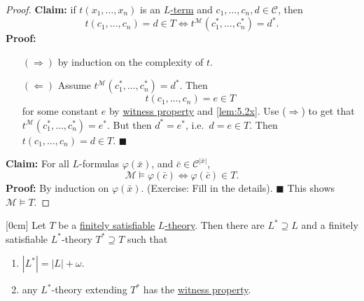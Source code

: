 \documentclass{article}
\let\models\vDash
\begin{document}
\begin{proof}
  \textbf{Claim:} if $t(x_1, \dotsc, x_n)$ is an \hyperlink{def:lterm}{$L$-term} and $c_1, \dotsc, c_n, d \in \mathscr{C}$, then
  \begin{equation*}
    t(c_1, \dotsc, c_n) = d \in T \iff t^\mathcal{M}(c_1^*, \dotsc, c_n^*) = d^*.
  \end{equation*}
  \textbf{Proof:}
  \begin{itemize}
    \item [$(\Rightarrow)$] by induction on the complexity of $t$.
    \item [$(\Leftarrow)$] Assume $t^\mathcal{M}(c_1^*, \dotsc, c_n^*) = d^*$.
    Then
    \begin{equation*}t(c_1, \dotsc, c_n) = e \in T\end{equation*}
    for some constant $e$ by \hyperlink{def:wp}{witness property} and \cref{lem:5.2x}.
    Use ($\Rightarrow$) to get that $t^\mathcal{M}(c_1^*, \dotsc, c_n^*) = e^*$.
    But then $d^* = e^*$, i.e.\ $d = e \in T$.
    Then $t(c_1, \dotsc, c_n) = d \in T$. $\blacksquare$
  \end{itemize}

  \textbf{Claim:} For all $L$-formulas $\varphi(\bar{x})$, and $\bar{c} \in \mathscr{C}^{|\bar{x}|}$,
  \begin{equation*}
    \mathcal{M} \models \varphi(\bar{c}) \iff \varphi(\bar{c}) \in T.
  \end{equation*}
  \textbf{Proof:} By induction on $\varphi(\bar{x})$. (Exercise: Fill in the details).  $\blacksquare$
  This shows $\mathcal{M} \models T$.
\end{proof}
\begin{nlemma}\label{lem:5.4x}
  [0cm]
  Let $T$ be a \hyperlink{def:fs}{finitely satisfiable} \hyperlink{def:ltheory}{$L$-theory}.
  Then there are $L^* \supseteq L$ and a finitely satisfiable $L^*$-theory $T^* \supseteq T$ such that
  \begin{enumerate}[label=(\roman*)]
    \item $|L^*| = |L| + \omega$.
    \item any $L^*$-theory extending $T^*$ has the \hyperlink{def:wp}{witness property}.
  \end{enumerate}
\end{nlemma}
\end{document}
